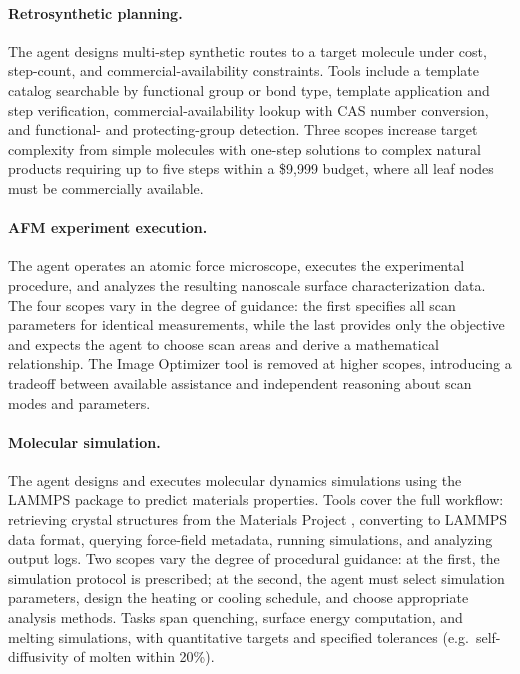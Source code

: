 \paragraph{Retrosynthetic planning.}
The agent designs multi-step synthetic routes to a target molecule under cost, step-count, and commercial-availability constraints. Tools include a template catalog searchable by functional group or bond type, template application and step verification, commercial-availability lookup with CAS number conversion, and functional- and protecting-group detection. Three scopes increase target complexity from simple molecules with one-step solutions to complex natural products requiring up to five steps within a \$9{,}999 budget, where all leaf nodes must be commercially available.
 
\paragraph{AFM experiment execution.}
The agent operates an atomic force microscope, executes the experimental procedure, and analyzes the resulting nanoscale surface characterization data. The four scopes vary in the degree of guidance: the first specifies all scan parameters for identical measurements, while the last provides only the objective and expects the agent to choose scan areas and derive a mathematical relationship. The Image Optimizer tool is removed at higher scopes, introducing a tradeoff between available assistance and independent reasoning about scan modes and parameters. 
 
\paragraph{Molecular simulation.}
The agent designs and executes molecular dynamics simulations using the LAMMPS package \autocite{LAMMPS} to predict materials properties. Tools cover the full workflow: retrieving crystal structures from the Materials Project \autocite{jain2013commentary, Horton2025}, converting to LAMMPS data format, querying force-field metadata, running simulations, and analyzing output logs.  Two scopes vary the degree of procedural guidance: at the first, the simulation protocol is prescribed; at the second, the agent must select simulation parameters, design the heating or cooling schedule, and choose appropriate analysis methods. Tasks span quenching, surface energy computation, and melting simulations, with quantitative targets and specified tolerances (e.g.\ self-diffusivity of molten  within 20\%).
 
